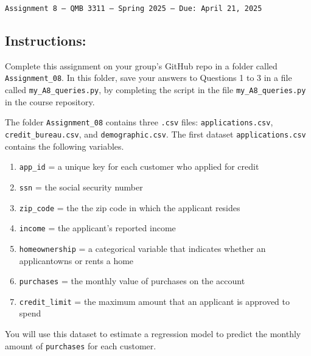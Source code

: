 \documentclass[11pt]{exam}
\begin{document}
\texttt{Assignment 8 --- QMB 3311 ---  Spring 2025 --- Due: April 21, 2025}

\subsection*{Instructions:}

Complete this assignment on your group's GitHub repo in a folder called \texttt{Assignment\_08}. In this folder, save your answers to Questions 1 to 3 in a file called \texttt{my\_A8\_queries.py}, by completing the script in the file \texttt{my\_A8\_queries.py} in the course repository. 

    \begin{questions}

\question The folder \texttt{Assignment\_08} contains three \texttt{.csv} files: \texttt{applications.csv}, \texttt{credit\_bureau.csv}, and \texttt{demographic.csv}. The first dataset \texttt{applications.csv} contains the following variables.

\begin{enumerate}
\item \texttt{app\_id} = a unique key for each customer who applied for credit
\item \texttt{ssn} = the social security number
\item \texttt{zip\_code} = the the zip code in which the applicant resides
\item \texttt{income} = the applicant's reported income
\item \texttt{homeownership} = a categorical variable that indicates whether an applicantowns or rents a home
\item \texttt{purchases} = the monthly value of purchases on the account
\item \texttt{credit\_limit} = the maximum amount that an applicant is approved to spend
\end{enumerate}

You will use this dataset to estimate a regression model to predict the monthly amount of \texttt{purchases} for each customer.

\end{questions}
\end{document}

